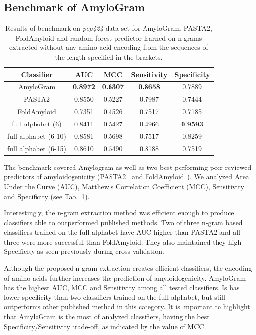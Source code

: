 \documentclass{bioinfo}
\begin{document}
  


\subsection{Benchmark of AmyloGram}

\begin{table}[ht]
\centering
\caption{Results of benchmark on \textit{pep424} data set for AmyloGram, 
PASTA2, FoldAmyloid and random forest predictor learned on n-grams extracted 
without any amino acid encoding from the sequences of the length specified in 
the brackets.} 
\label{tab:bench_summary}
\begin{tabular}{ccccc}
  \toprule
Classifier & AUC & MCC & Sensitivity & Specificity \\ 
  \midrule
AmyloGram & \textbf{0.8972} & \textbf{0.6307} & \textbf{0.8658} & 0.7889 \\ 
   \rowcolor[gray]{0.85}PASTA2 & 0.8550 & 0.5227 & 0.7987 & 0.7444 \\ 
  FoldAmyloid & 0.7351 & 0.4526 & 0.7517 & 0.7185 \\ 
   \rowcolor[gray]{0.85}full alphabet (6) & 0.8411 & 0.5427 & 0.4966 & 
\textbf{0.9593} \\ 
  full alphabet (6-10) & 0.8581 & 0.5698 & 0.7517 & 0.8259 \\ 
   \rowcolor[gray]{0.85}full alphabet (6-15) & 0.8610 & 0.5490 & 0.8188 & 
0.7519 
\\ 
   \bottomrule
\end{tabular}
\end{table}

The benchmark covered Amylogram as well as two best-performing peer-reviewed 
predictors of amyloidogenicity (PASTA2~\citep{walsh_pasta_2014} and 
FoldAmyloid~\citep{garbuzynskiy_foldamyloid:_2010}). We analyzed Area Under the 
Curve (AUC), Matthew's Correlation Coefficient (MCC), Sensitivity and 
Specificity (see Tab.~\ref{tab:bench_summary}).
    
  Interestingly, the n-gram extraction method was efficient enough to produce 
classifiers able to outperformed published methods. Two of three n-gram based 
classifiers trained on the full alphabet have AUC higher than PASTA2 and all 
three were more successful than FoldAmyloid. They also maintained they high 
Specificity as seen previously during cross-validation.
    
  Although the proposed n-gram extraction creates efficient classifiers, the 
encoding of amino acids further increases the prediction of amyloidogenicity. 
AmyloGram has the highest AUC, MCC and Sensitivity among all tested classifiers. 
Is has lower specificity than two classifiers trained on the full alphabet, but 
still outperforms other published method in this category. It is important to 
highlight that AmyloGram is the most  of analyzed classifiers, having 
the best Specificity/Sensitivity trade-off, as indicated by the value of MCC.
\end{document}
